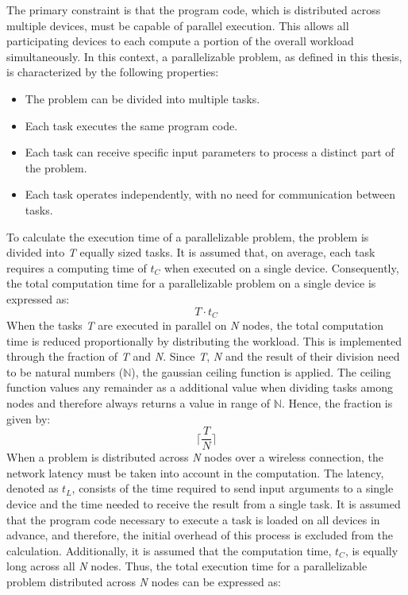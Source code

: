 The primary constraint is that the program code, which is distributed across multiple devices, must be capable of parallel execution. This allows all participating devices to  each compute a portion of the overall workload simultaneously. In this context, a parallelizable problem, as defined in this thesis, is characterized by the following properties:
\begin{itemize}
    \item The problem can be divided into multiple tasks.
    \item Each task executes the same program code.
    \item Each task can receive specific input parameters to process a distinct part of the problem.
    \item Each task operates independently, with no need for communication between tasks.
\end{itemize}
To calculate the execution time of a parallelizable problem, the problem is divided into \emph{T} equally sized tasks. It is assumed that, on average, each task requires a computing time of $t_{C}$ when executed on a single device. Consequently, the total computation time for a parallelizable problem on a single device is expressed as:
\begin{equation}
T \cdot t_{C}
\label{equ:single}
\end{equation}
When the tasks \emph{T} are executed in parallel on \emph{N} nodes, the total computation time is reduced proportionally by distributing the workload. This is implemented through the fraction of \emph{T} and \emph{N}. Since \emph{T}, \emph{N} and the result of their division need to be natural numbers ($\mathbb{N}$), the gaussian ceiling function is applied. The ceiling function values any remainder as a additional value when dividing tasks among nodes and therefore always returns a value in range of $\mathbb{N}$. Hence, the fraction is given by: 
\begin{equation}
\bigg\lceil\frac{T}{N}\bigg\rceil
\label{equ:frac}
\end{equation}
When a problem is distributed across \emph{N} nodes over a wireless connection, the network latency must be taken into account in the computation. The latency, denoted as $t_{L}$, consists of the time required to send input arguments to a single device and the time needed to receive the result from a single task. It is assumed that the program code necessary to execute a task is loaded on all devices in advance, and therefore, the initial overhead of this process is excluded from the calculation. Additionally, it is assumed that the computation time, $t_{C}$, is equally long across all \emph{N} nodes. Thus, the total execution time for a parallelizable problem distributed across \emph{N} nodes can be expressed as: 
